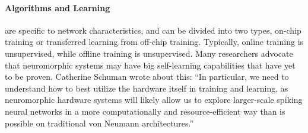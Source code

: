 \paragraph{Algorithms and Learning} are specific to network characteristics, and can be divided into two types, on-chip training or transferred learning from off-chip training.
Typically, online training is unsupervised, while offline training is unsupervised.
    Many researchers advocate that neuromorphic systems may have big self-learning capabilities that have yet to be proven. Catherine Schuman wrote about this: ``In particular, we need to understand how to best utilize the hardware itself in training and learning, as neuromorphic hardware systems will likely allow us to explore larger-scale spiking neural networks in a more computationally and resource-efficient way than is possible on traditional von Neumann architectures.''
\cite{schuman_survey_2017}

